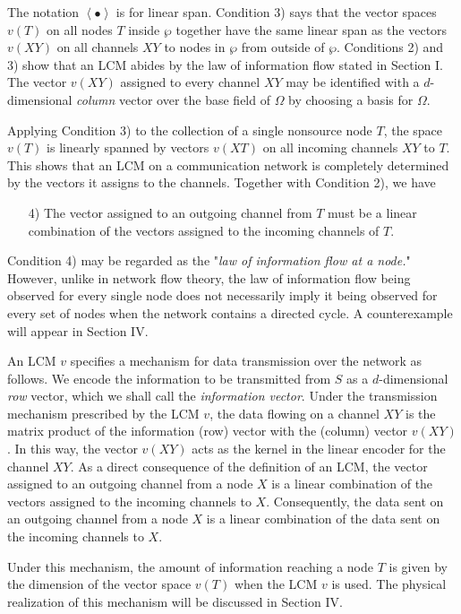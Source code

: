 \documentclass[journal]{IEEEtran}
\begin{document}
\par 
The notation $\left \langle \bullet \right \rangle $ is for linear span. Condition 3) says that the vector spaces $v(T)$ on all nodes $T$ inside $\wp$ together have the same linear span as the vectors $v(XY)$ on all channels $XY$ to nodes in $\wp$ from outside of $\wp$. Conditions 2) and 3) show that an LCM abides by the law of information flow stated in Section I. The vector $v(XY)$ assigned to every channel $XY$ may be identified with a $d$-dimensional \emph{column} vector over the base field of $\Omega$ by choosing a basis for $\Omega$.
\par 
Applying Condition 3) to the collection of a single nonsource node $T$, the space $v(T)$ is linearly spanned by vectors $v(XT)$ on all incoming channels $XY$ to $T$. This shows that an LCM on a communication network is completely determined by the vectors it assigns to the channels. Together with Condition 2), we have
\begin{itemize}
	\item[4)] The vector assigned to an outgoing channel from $T$ must be a linear combination of the vectors assigned to the incoming	channels of $T$.
\end{itemize}
Condition 4) may be regarded as the "\emph{law of information flow at a node.}" However, unlike in network flow theory, the law of information flow being observed for every single node does not necessarily imply it being observed for every set of nodes when the network contains a directed cycle. A counterexample will appear in Section IV.
\par 
An LCM $v$ specifies a mechanism for data transmission over the network as follows. We encode the information to be transmitted from $S$ as a $d$-dimensional \emph{row} vector, which we shall call the \emph{information vector}. Under the transmission mechanism prescribed by the LCM $v$, the data flowing on a channel $XY$ is the matrix product of the information (row) vector with the (column) vector $v(XY)$. In this way, the vector $v(XY)$ acts as the kernel in the linear encoder for the channel $XY$. As a direct consequence of the definition of an LCM, the vector assigned to an outgoing channel from a node $X$ is a linear combination of the vectors assigned to the incoming channels to $X$. Consequently, the data sent on an outgoing channel from a node $X$ is a linear combination of the data sent on the incoming channels to $X$.
\par 
Under this mechanism, the amount of information reaching a node $T$ is given by the dimension of the vector space $v(T)$ when the LCM $v$ is used. The physical realization of this mechanism will be discussed in Section IV.
\end{document}

